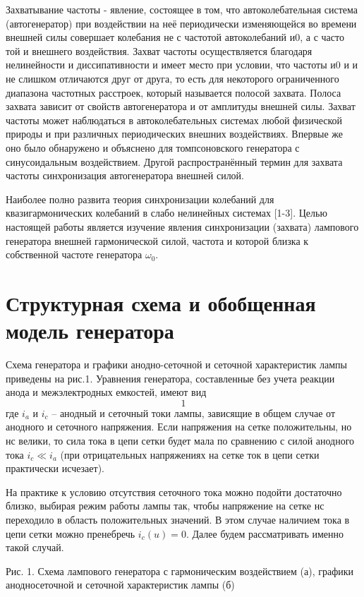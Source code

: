 \documentclass[a4paper,14pt]{extarticle}
\begin{document}
Захватывание частоты - явление, состоящее в том, что автоколебательная система (автогенератор) при воздействии на неё периодически изменяющейся во времени внешней силы совершает колебания не с частотой автоколебаний и0, а с часто той и внешнего воздействия. Захват частоты осуществляется благодаря нелинейности и диссипативности и имеет место при условии, что частоты и0 и и не слишком отличаются друг от друга, то есть для некоторого ограниченного диапазона частотных расстроек, который называется полосой захвата. Полоса захвата зависит от свойств автогенератора и от амплитуды внешней силы. Захват частоты может наблюдаться в автоколебательных системах любой физической природы и при различных периодических внешних воздействиях. Впервые же оно было обнаружено и объяснено для томпсоновского генератора с синусоидальным воздействием. Другой распространённый термин для захвата частоты синхронизация автогенератора внешней силой.

Наиболее полно развита теория синхронизации колебаний для квазигармонических колебаний в слабо нелинейных системах [1-3]. Целью настоящей работы является изучение явления синхронизации (захвата) лампового генератора внешней гармонической силой, частота и которой близка к собственной частоте генератора $\omega_0$.


\section{Структурная схема и обобщенная модель генератора}
Схема генератора и графики анодно-сеточной и сеточной характеристик лампы приведены на рис.1. Уравнения генератора, составленные без учета реакции анода и межэлектродных емкостей, имеют вид
\begin{equation}
  \label{eq1}
  1
\end{equation}
где $i_a$ и $i_c$ -- анодный и сеточный токи лампы, зависящие в общем случае от анодного и сеточного напряжения. Если напряжения на сетке положительны, но нс велики, то сила тока в цепи сетки будет мала по сравнению с силой анодного тока $i_c \ll i_a$ (при отрицательных напряжениях на сетке ток в цепи сетки практически исчезает). 

На практике к условию отсутствия сеточного тока можно подойти достаточно близко, выбирая режим работы лампы так, чтобы напряжение на сетке нс переходило в область положительных значений. В этом случае наличием тока в цепи сетки можно пренебречь $i_c(u) = 0$. Далее будем рассматривать именно такой случай.

Рис. 1. Схема лампового генератора с гармоническим воздействием (а), графики анодносеточной и сеточной характеристик лампы (б)
\end{document}
